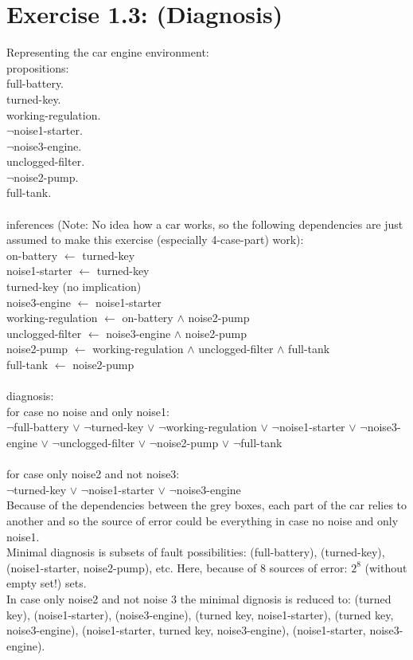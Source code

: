 \documentclass[10pt,a4paper]{article}
\begin{document}
\section*{Exercise 1.3: (Diagnosis)} 
Representing the car engine environment: \\
propositions: \\
full-battery.\\
turned-key.\\
working-regulation.\\
$\lnot$noise1-starter. \\
$\lnot$noise3-engine. \\
unclogged-filter. \\
$\lnot$noise2-pump. \\
full-tank. \\
\\
inferences (Note: No idea how a car works, so the following dependencies are just assumed to make this exercise (especially 4-case-part) work):\\
on-battery $\leftarrow$ turned-key \\
noise1-starter $\leftarrow$ turned-key \\
turned-key (no implication)\\
noise3-engine  $\leftarrow$ noise1-starter \\
working-regulation $\leftarrow$ on-battery  $\land$ noise2-pump \\
unclogged-filter $\leftarrow$ noise3-engine $\land$ noise2-pump \\
noise2-pump $\leftarrow$ working-regulation $\land$ unclogged-filter $\land$ full-tank \\
full-tank $\leftarrow$ noise2-pump \\
\\
diagnosis: \\
for case no noise and only noise1: \\
$\lnot$full-battery $\lor$
$\lnot$turned-key $\lor$
$\lnot$working-regulation $\lor$
$\lnot$noise1-starter $\lor$
$\lnot$noise3-engine $\lor$
$\lnot$unclogged-filter $\lor$
$\lnot$noise2-pump $\lor$
$\lnot$full-tank \\
\\
for case only noise2 and not noise3: \\
$\lnot$turned-key $\lor$
$\lnot$noise1-starter $\lor$
$\lnot$noise3-engine \\
Because of the dependencies between the grey boxes, each part of the car relies to another and so the source of error could be everything in case no noise and only noise1. \\
Minimal diagnosis is subsets of fault possibilities:
(full-battery), (turned-key), (noise1-starter, noise2-pump), etc. Here, because of 8 sources of error: $2^{8}$ (without empty set!) sets. \\ In case only noise2 and not noise 3 the minimal dignosis is reduced to:
(turned key), (noise1-starter), (noise3-engine), (turned key, noise1-starter), (turned key, noise3-engine), (noise1-starter, turned key, noise3-engine), (noise1-starter, noise3-engine).
\end{document}
